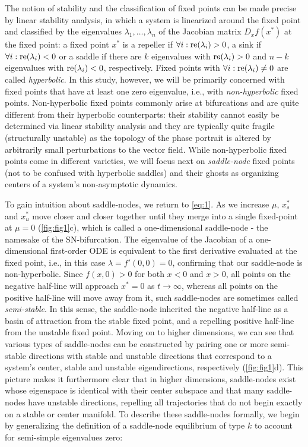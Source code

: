 \documentclass{article}
\theoremstyle{definition}
\begin{document}
\begin{refsection}
The notion of stability and the classification of fixed points can be made precise by linear stability analysis, in which a system is linearized around the fixed point and classified by the eigenvalues $\lambda_1,\dots,\lambda_n$ of the Jacobian matrix $D_x f(x^*)$ at the fixed point: a fixed point $x^*$ is a repeller if $\forall i:\textnormal{re}(\lambda_i)>0$, a sink if $\forall i:\textnormal{re}(\lambda_i)<0$ or a saddle if there are $k$ eigenvalues with $\textnormal{re}(\lambda_i)>0$ and $n-k$ eigenvalues with $\textnormal{re}(\lambda_i)<0$, respectively. Fixed points with $\forall i:\textnormal{re}(\lambda_i)\neq0$ are called \emph{hyperbolic}. In this study, however, we will be primarily concerned with fixed points that have at least one zero eigenvalue, i.e., with \emph{non-hyperbolic} fixed points. Non-hyperbolic fixed points commonly arise at bifurcations and are quite different from their hyperbolic counterparts: their stability cannot easily be determined via linear stability analysis and they are typically quite fragile (structurally unstable) as the topology of the phase portrait is altered by arbitrarily small perturbations to the vector field. While non-hyperbolic fixed points come in different varieties, we will focus next on \emph{saddle-node} fixed points (not to be confused with hyperbolic saddles) and their ghosts as organizing centers of a system's non-asymptotic dynamics. 

To gain intuition about saddle-nodes, we return to \autoref{eq:1}. As we increase $\mu$, $x_s^*$ and $x_u^*$ move closer and closer together until they merge into a single fixed-point at $\mu=0$ (\autoref{fig:fig1}c), which is called a one-dimensional saddle-node - the namesake of the SN-bifurcation. The eigenvalue of the Jacobian of a one-dimensional first-order ODE is equivalent to the first derivative evaluated at the fixed point, i.e., in this case $\lambda=f'(0,0)=0$, confirming that our saddle-node is non-hyperbolic.
Since $f(x,0)>0$ for both $x<0$ and $x>0$, all points on the negative half-line will approach $x^*=0$ as $t\to\infty$, whereas all points on the positive half-line will move away from it, such saddle-nodes are sometimes called \emph{semi-stable}. In this sense, the saddle-node inherited the negative half-line as a basin of attraction from the stable fixed point, and a repelling positive half-line from the unstable fixed point. Moving on to higher dimensions, we can see that various types of saddle-nodes can be constructed by pairing one or more semi-stable directions with stable and unstable directions that correspond to a system's center, stable and unstable eigendirections, respectively (\autoref{fig:fig1}d). This picture makes it furthermore clear that in higher dimensions, saddle-nodes exist whose eigenspace is identical with their center subspace and that many saddle-nodes have unstable directions, repelling all trajectories that do not begin exactly on a stable or center manifold. To describe these saddle-nodes formally, we begin by generalizing the definition of a saddle-node equilibrium of type $k$ \cite{Amaral2010,Amaral2012} to account for semi-simple eigenvalues zero:


\end{refsection}
\end{document}
